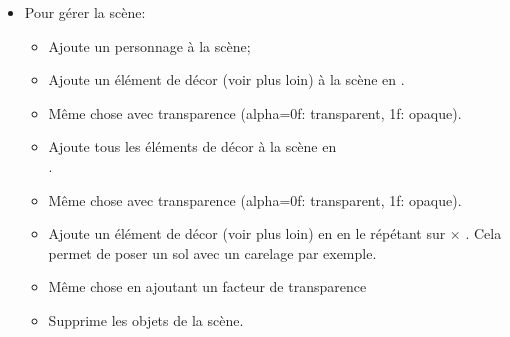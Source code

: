 \documentclass[11pt]{article}
\begin{document}
\begin{itemize}
    \item Pour gérer la scène:
    \begin{itemize}

        \item {}
        
            Ajoute un personnage à la scène;

        \item {}

            Ajoute un élément de décor  (voir plus loin) à la scène en .

        \item {}
        
            Même chose avec transparence (alpha=0f: transparent, 1f: opaque).

        \item {}
        
            Ajoute tous les éléments de décor  à la scène en \\.

        \item {}
    
            Même chose avec transparence (alpha=0f: transparent, 1f: opaque).

        \item {}

            Ajoute un élément de décor (voir plus loin) en  en le répétant sur 
             $\times$ .
            Cela permet de poser un sol avec un carelage par exemple.

        \item {}

            Même chose en ajoutant un facteur de transparence 
            


        \item {}
        
            Supprime les objets de la scène.


\end{itemize}
\end{itemize}
\end{document}

